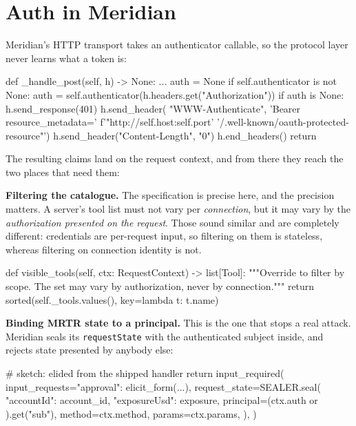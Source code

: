 \section{Auth in Meridian}

Meridian's HTTP transport takes an authenticator callable, so the protocol layer
never learns what a token is:

\begin{py}
def _handle_post(self, h) -> None:
    ...
    auth = None
    if self.authenticator is not None:
        auth = self.authenticator(h.headers.get("Authorization"))
        if auth is None:
            h.send_response(401)
            h.send_header(
                "WWW-Authenticate",
                'Bearer resource_metadata='
                f'"http://{self.host}:{self.port}'
                '/.well-known/oauth-protected-resource"')
            h.send_header("Content-Length", "0")
            h.end_headers()
            return
\end{py}

The resulting claims land on the request context, and from there they reach the
two places that need them:

\textbf{Filtering the catalogue.} The specification is precise here, and the
precision matters. A server's tool list must not vary per \emph{connection}, but
it may vary by the \emph{authorization presented on the request}. Those sound
similar and are completely different: credentials are per-request input, so
filtering on them is stateless, whereas filtering on connection identity is not.

\begin{py}
def visible_tools(self, ctx: RequestContext) -> list[Tool]:
    """Override to filter by scope. The set may vary by authorization,
    never by connection."""
    return sorted(self._tools.values(), key=lambda t: t.name)
\end{py}

\textbf{Binding MRTR state to a principal.} This is the one that stops a real
attack. Meridian seals its \texttt{requestState} with the authenticated subject
inside, and rejects state presented by anybody else:

\begin{py}
# sketch: elided from the shipped handler
return input_required(
    input_requests={"approval": elicit_form(...)},
    request_state=SEALER.seal(
        {"accountId": account_id, "exposureUsd": exposure},
        principal=(ctx.auth or {}).get("sub"),
        method=ctx.method,
        params=ctx.params,
    ),
)
\end{py}

